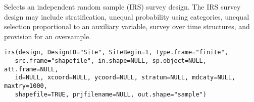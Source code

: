 \begin{Description}\relax
Selects an independent random sample (IRS) survey design. The IRS survey
design may include stratification, unequal probability using categories,
unequal selection proportional to an auxiliary variable, survey over time
structures, and provision for an oversample.
\end{Description}
\begin{Usage}
\begin{verbatim}
irs(design, DesignID="Site", SiteBegin=1, type.frame="finite",
   src.frame="shapefile", in.shape=NULL, sp.object=NULL, att.frame=NULL,
   id=NULL, xcoord=NULL, ycoord=NULL, stratum=NULL, mdcaty=NULL, maxtry=1000,
   shapefile=TRUE, prjfilename=NULL, out.shape="sample")
\end{verbatim}
\end{Usage}
